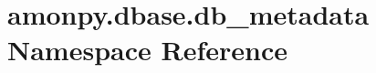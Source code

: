 \hypertarget{namespaceamonpy_1_1dbase_1_1db__metadata}{\section{amonpy.\-dbase.\-db\-\_\-metadata Namespace Reference}
\label{namespaceamonpy_1_1dbase_1_1db__metadata}
}
